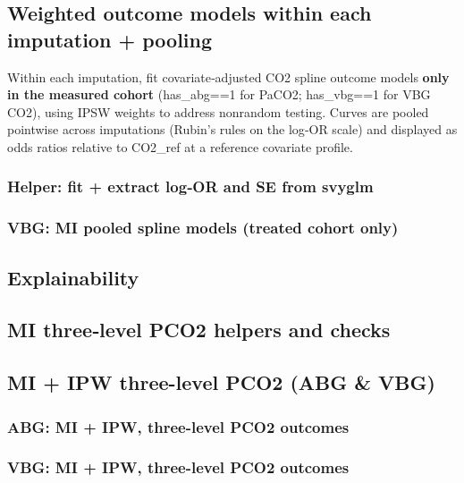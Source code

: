 \documentclass[
  11pt,
  letterpaper,
  DIV=11,
  numbers=noendperiod]{scrartcl}
\begin{document}
\subsection{Weighted outcome models within each imputation +
pooling}\label{weighted-outcome-models-within-each-imputation-pooling}

Within each imputation, fit covariate‑adjusted CO2 spline outcome models
\textbf{only in the measured cohort} (has\_abg==1 for PaCO2; has\_vbg==1
for VBG CO2), using IPSW weights to address nonrandom testing. Curves
are pooled pointwise across imputations (Rubin's rules on the log‑OR
scale) and displayed as odds ratios relative to CO2\_ref at a reference
covariate profile.

\subsubsection{Helper: fit + extract log‑OR and SE from
svyglm}\label{helper-fit-extract-logor-and-se-from-svyglm}

\subsubsection{VBG: MI pooled spline models (treated cohort
only)}\label{vbg-mi-pooled-spline-models-treated-cohort-only}

\subsection{Explainability}\label{explainability}

\subsection{MI three‑level PCO2 helpers and
checks}\label{mi-threelevel-pco2-helpers-and-checks}

\subsection{MI + IPW three-level PCO2 (ABG \&
VBG)}\label{mi-ipw-three-level-pco2-abg-vbg}

\subsubsection{ABG: MI + IPW, three-level PCO2
outcomes}\label{abg-mi-ipw-three-level-pco2-outcomes}

\subsubsection{VBG: MI + IPW, three-level PCO2
outcomes}\label{vbg-mi-ipw-three-level-pco2-outcomes}
\end{document}
